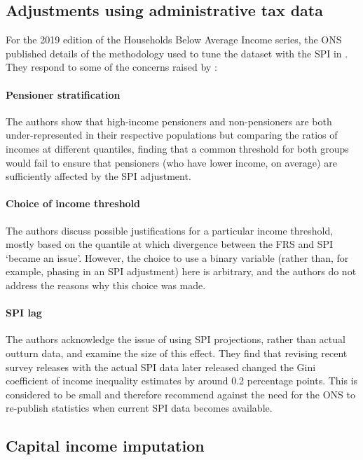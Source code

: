 \documentclass[twocolumn]{article}
\begin{document}
\subsection{Adjustments using administrative tax data}

For the 2019 edition of the Households Below Average Income series, the ONS published details of the methodology used to tune the dataset with the SPI in \cite{ons_spi_version_2}. They respond to some of the concerns raised by \cite{ifs_survey_under_coverage}:

\paragraph{Pensioner stratification} The authors show that high-income pensioners and non-pensioners are both under-represented in their respective populations but comparing the ratios of incomes at different quantiles, finding that a common threshold for both groups would fail to ensure that pensioners (who have lower income, on average) are sufficiently affected by the SPI adjustment.

\paragraph{Choice of income threshold} The authors discuss possible justifications for a particular income threshold, mostly based on the quantile at which divergence between the FRS and SPI `became an issue'. However, the choice to use a binary variable (rather than, for example, phasing in an SPI adjustment) here is arbitrary, and the authors do not address the reasons why this choice was made.

\paragraph{SPI lag} The authors acknowledge the issue of using SPI projections, rather than actual outturn data, and examine the size of this effect. They find that revising recent survey releases with the actual SPI data later released changed the Gini coefficient of income inequality estimates by around 0.2 percentage points. This is considered to be small and therefore recommend against the need for the ONS to re-publish statistics when current SPI data becomes available.

\subsection{Capital income imputation}
\end{document}
